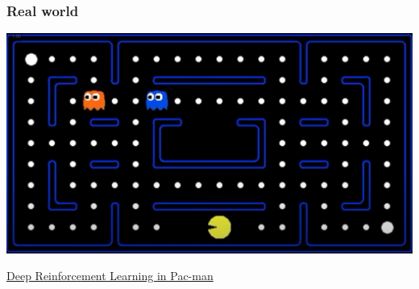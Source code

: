 \documentclass[fullscreen=true, bookmarks=true, hyperref={pdfencoding=unicode}]{beamer}
\begin{document}
\begin{frame}
  \frametitle{Real world}

  \begin{center}
    \includegraphics[keepaspectratio,
                     width=.8\paperwidth]{pacman.png}

                     \href{https://www.youtube.com/watch?v=QilHGSYbjDQ}{Deep Reinforcement Learning in Pac-man}
  \end{center}
\end{frame}

\end{document}
